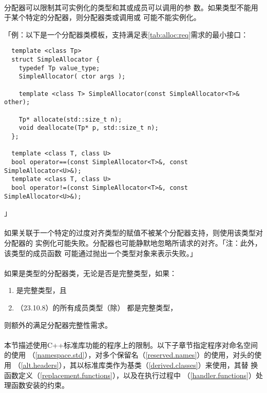 \paragraph{}
分配器可以限制其可实例化的类型和其或成员可以调用的参
数。如果类型不能用于某个特定的分配器，则分配器类或调用或
可能不能实例化。

「例：以下是一个分配器类模板，支持满足表\ref{tab:alloc:req}需求的最小接口：
\begin{lstlisting}
  template <class Tp>
  struct SimpleAllocator {
    typedef Tp value_type;
    SimpleAllocator( ctor args );

    template <class T> SimpleAllocator(const SimpleAllocator<T>& other);

    Tp* allocate(std::size_t n);
    void deallocate(Tp* p, std::size_t n);
  };

  template <class T, class U>
  bool operator==(const SimpleAllocator<T>&, const SimpleAllocator<U>&);
  template <class T, class U>
  bool operator!=(const SimpleAllocator<T>&, const SimpleAllocator<U>&);
\end{lstlisting}」

\paragraph{}
如果关联于一个特定的过度对齐类型的赋值不被某个分配器支持，则使用该类型对分配器的
实例化可能失败。分配器也可能静默地忽略所请求的对齐。「注：此外，该类型的成员函数
可能通过抛出一个类型对象来表示失败。」

\paragraph{}
如果是类型的分配器类，无论是否是完整类型，如果：
\begin{enumerate}
  \item{是完整类型，且}
  \item{（23.10.8）的所有成员类型（除）
    都是完整类型，}
\end{enumerate}
则额外的满足分配器完整性需求。

\paragraph{}
本节描述使用C++标准库功能的程序上的限制。以下子章节指定程序对命名空间的使用
（\ref{namespace.std}），对多个保留名（\ref{reserved.names}）的使用，对头的使用
（\ref{alt.headers}），其以标准库类作为基类（\ref{derived.classes}）来使用，其替
换函数定义（\ref{replacement.functions}），以及在执行过程中
（\ref{handler.functions}）处理函数安装的约束。

